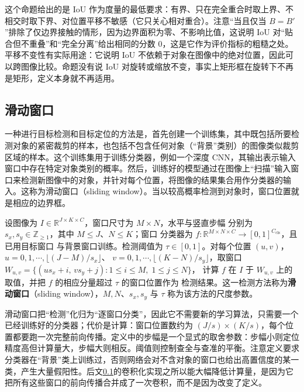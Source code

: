 \documentclass[../../main.tex]{subfiles}
\begin{document}
\begin{remark}
这个命题给出的是 IoU 作为度量的最低要求：有界、只在完全重合时取上界、不相交时取下界、对位置平移不敏感（它只关心相对重合）。注意“当且仅当 $B=B'$”排除了仅边界接触的情形，因为边界面积为零、不影响比值，这说明 IoU 对“贴合但不重叠”和“完全分离”给出相同的分数 $0$，这是它作为评价指标的粗糙之处。平移不变性有实际用途：它说明 IoU 不依赖于对象在图像中的绝对位置，因此可以跨图像比较。命题没有说 IoU 对旋转或缩放不变，事实上矩形框在旋转下不再是矩形，定义本身就不再适用。
\end{remark}

\subsection{滑动窗口}\label{subsection:ch10-滑动窗口}

一种进行目标检测和目标定位的方法是，首先创建一个训练集，其中既包括所要检测对象的紧密裁剪的样本，也包括不包含任何对象（“背景”类别）的图像类似裁剪区域的样本。这个训练集用于训练分类器，例如一个深度 CNN，其输出表示输入窗口中存在特定对象类别的概率。然后，训练好的模型通过在图像上“扫描”输入窗口来检测新图像中的对象，并针对每个位置，将图像的结果集合用作分类器的输入。这称为滑动窗口（sliding window）。当以较高概率检测到对象时，窗口位置就是相应的边界框。

\begin{definition}[滑动窗口]\label{definition:ch10-滑动窗口}
设图像为 $I\in\mathbb{R}^{J\times K\times C}$，窗口尺寸为 $M\times N$，水平与竖直步幅
分别为 $s_x,s_y\in\mathbb{Z}_{\geqslant1}$，其中 $M\leqslant J$、$N\leqslant K$；窗口
分类器为 $f:\mathbb{R}^{M\times N\times C}\to[0,1]^{C_{\mathrm{cls}}}$，且已用目标窗口
与背景窗口训练。检测阈值为 $\tau\in[0,1]$。对每个位置
$(u,v)$，$u=0,1,\cdots,\lfloor(J-M)/s_x\rfloor$、
$v=0,1,\cdots,\lfloor(K-N)/s_y\rfloor$，取窗口
$W_{u,v}=\{(u s_x+i,\,v s_y+j):1\leqslant i\leqslant M,\;1\leqslant j\leqslant N\}$，
计算 $f$ 在 $I$ 于 $W_{u,v}$ 上的取值，并把 $f$ 的相应分量超过 $\tau$ 的窗口位置作为
检测结果。这一检测方法称为\textbf{滑动窗口}（sliding window），$M,N$、$s_x,s_y$ 与
$\tau$ 称为该方法的尺度参数。
\end{definition}

\begin{remark}
滑动窗口把“检测”化归为“逐窗口分类”，因此它不需要新的学习算法，只需要一个已经训练好的分类器；代价是计算：窗口位置数约为 $(J/s)\times(K/s)$，每个位置都要跑一次完整前向传播。定义中的步幅是一个显式的取舍参数：步幅小则定位精度高但计算量大，步幅大则相反。阈值则控制查全与查准的平衡。注意定义要求分类器在“背景”类上训练过，否则网络会对不含对象的窗口也给出高置信度的某一类，产生大量假阳性。后文\cref{subsection:ch10-滑动窗口}的卷积化实现之所以能大幅降低计算量，是因为它把所有这些窗口的前向传播合并成了一次卷积，而不是因为改变了定义。
\end{remark}
\end{document}
